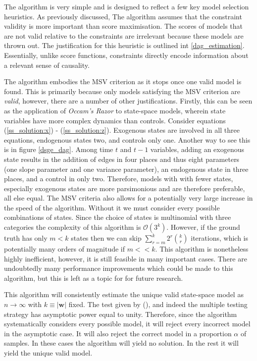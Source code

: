 \documentclass{article}
\begin{document}
The algorithm is very simple and is designed to reflect a few key model selection heuristics. As previously discussed, The algorithm assumes that the constraint validity is more important than score maximisation. The scores of models that are not valid relative to the constraints are irrelevant because these models are thrown out. The justification for this heuristic is outlined int \ref{dag_estimation}. Essentially, unlike score functions, constraints directly encode information about a relevant sense of causality.

The algorithm embodies the MSV criterion as it stops once one valid model is found. This is primarily because only models satisfying the MSV criterion are \textit{valid}, however, there are a number of other justifications. Firstly, this can be seen as the application of \textit{Occam's Razor} to state-space models, wherein state variables have more complex dynamics than controls. Consider equations (\ref{ss_solution:x}) - (\ref{ss_solution:z}). Exogenous states are involved in all three equations, endogenous states two, and controls only one. Another way to see this is in figure \ref{dsge_dag}. Among time $t$ and $t-1$ variables, adding an exogenous state results in the addition of edges in four places and thus eight parameters (one slope parameter and one variance parameter), an endogenous state in three places, and a control in only two. Therefore, models with with fewer states, especially exogenous states are more parsimonious and are therefore preferable, all else equal. The MSV criteria also allows for a potentially very large increase in the speed of the algorithm. Without it we must consider every possible combinations of states. Since the choice of states is multinomial with three categories the complexity of this algorithm is $\mathcal{O}(3^k)$. However, if the ground truth has only $m < k$ states then we can skip $\sum_{r=m}^{k} 2^r {\binom{k}{r}}$ iterations, which is potentially many orders of magnitude if $m << k$. This algorithm is nonetheless highly inefficient, however, it is still feasible in many important cases. There are undoubtedly many performance improvements which could be made to this algorithm, but this is left as a topic for for future research.

This algorithm will consistently estimate the unique valid state-space model as $n \rightarrow \infty$ with $k \equiv |\mathbf{w}|$ fixed. The test given by \citeauthor{srivastava2005some} (\citeyear{srivastava2005some}), and indeed the multiple testing strategy has asymptotic power equal to unity. Therefore, since the algorithm systematically considers every possible model, it will reject every incorrect model in the asymptotic case. It will also reject the correct model in a proportion $\alpha$ of samples. In these cases the algorithm will yield no solution. In the rest it will yield the unique valid model. 
\end{document}
